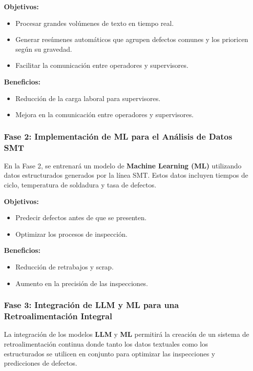 \textbf{Objetivos:}
\begin{itemize}
    \item Procesar grandes volúmenes de texto en tiempo real.
    \item Generar resúmenes automáticos que agrupen defectos comunes y los prioricen según su gravedad.
    \item Facilitar la comunicación entre operadores y supervisores.
\end{itemize}

\textbf{Beneficios:}
\begin{itemize}
    \item Reducción de la carga laboral para supervisores.
    \item Mejora en la comunicación entre operadores y supervisores.
\end{itemize}

\subsubsection{Fase 2: Implementación de ML para el Análisis de Datos SMT}

En la Fase 2, se entrenará un modelo de \textbf{Machine Learning (ML)} utilizando datos estructurados generados por la línea SMT. Estos datos incluyen tiempos de ciclo, temperatura de soldadura y tasa de defectos.

\textbf{Objetivos:}
\begin{itemize}
    \item Predecir defectos antes de que se presenten.
    \item Optimizar los procesos de inspección.
\end{itemize}

\textbf{Beneficios:}
\begin{itemize}
    \item Reducción de retrabajos y scrap.
    \item Aumento en la precisión de las inspecciones.
\end{itemize}

\subsubsection{Fase 3: Integración de LLM y ML para una Retroalimentación Integral}

La integración de los modelos \textbf{LLM} y \textbf{ML} permitirá la creación de un sistema de retroalimentación continua donde tanto los datos textuales como los estructurados se utilicen en conjunto para optimizar las inspecciones y predicciones de defectos.

